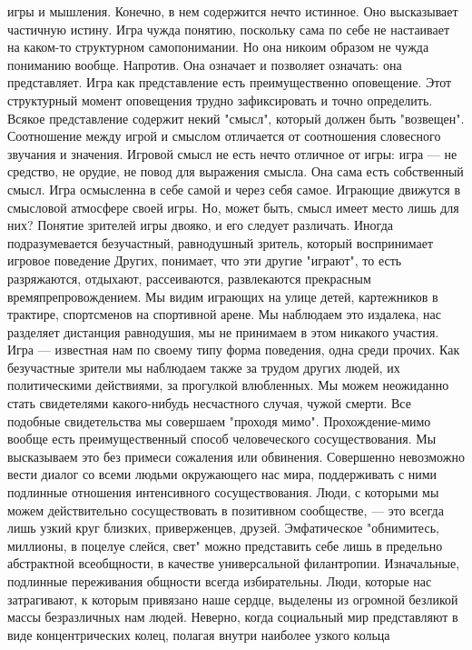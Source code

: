 \documentclass[12pt]{article}
\begin{document}
игры и мышления. Конечно, в нем содержится нечто истинное. Оно высказывает частичную истину. Игра чужда
понятию, поскольку сама по себе не настаивает на каком-то структурном самопонимании. Но она никоим
образом не чужда пониманию вообще. Напротив. Она означает и позволяет означать: она представляет. Игра как
представление  есть  преимущественно  оповещение.  Этот  структурный  момент  оповещения  трудно
зафиксировать  и  точно  определить.  Всякое  представление  содержит  некий  "смысл",  который  должен  быть
"возвещен". Соотношение между игрой и смыслом отличается от соотношения словесного звучания и значения.
Игровой смысл не есть нечто отличное от игры: игра --- не средство, не орудие, не повод для выражения смысла.
Она сама есть собственный смысл. Игра осмысленна в себе самой и через себя самое. Играющие движутся в
смысловой атмосфере своей игры. Но, может быть, смысл имеет место лишь для них?
Понятие зрителей игры двояко, и его следует различать. Иногда подразумевается безучастный, равнодушный
зритель,  который  воспринимает  игровое  поведение  Других,  понимает,  что  эти  другие  "играют",  то  есть
разряжаются,  отдыхают,  рассеиваются,  развлекаются  прекрасным  времяпрепровождением.  Мы  видим
играющих на улице детей, картежников в трактире, спортсменов на спортивной арене. Мы наблюдаем это
издалека, нас разделяет дистанция равнодушия, мы не принимаем в этом никакого участия. Игра --- известная
нам по своему типу форма поведения, одна среди прочих. Как безучастные зрители мы наблюдаем также за
трудом других людей, их политическими действиями, за прогулкой влюбленных. Мы можем неожиданно стать
свидетелями какого-нибудь несчастного случая, чужой смерти. Все подобные свидетельства мы совершаем
"проходя мимо". Прохождение-мимо вообще есть преимущественный способ человеческого сосуществования.
Мы высказываем это без примеси сожаления или обвинения. Совершенно невозможно вести диалог со всеми
людьми окружающего нас мира, поддерживать с ними подлинные отношения интенсивного сосуществования.
Люди, с которыми мы можем действительно сосуществовать в позитивном сообществе, --- это всегда лишь узкий
круг близких, приверженцев, друзей. Эмфатическое "обнимитесь, миллионы, в поцелуе слейся, свет" можно
представить  себе  лишь  в  предельно  абстрактной  всеобщности,  в  качестве  универсальной  филантропии.
Изначальные,  подлинные  переживания  общности  всегда  избирательны.  Люди,  которые  нас  затрагивают,  к
которым привязано наше сердце, выделены из огромной безликой массы безразличных нам людей. Неверно,
когда социальный мир представляют в виде концентрических колец, полагая внутри наиболее узкого кольца
\end{document}
